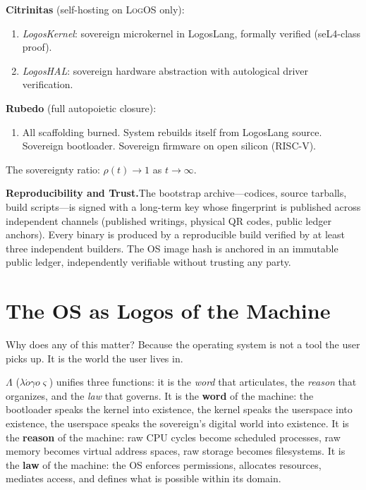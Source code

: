 \documentclass[11pt, oneside]{article}
\newcommand{\sep}{%
    \begin{center}\vspace{2pt}%
    \textcolor{LogosGray}{\textemdash\textemdash\textemdash}%
    \vspace{2pt}\end{center}%
}
\newcommand{\LogOS}{\textnormal{\textsc{LogOS}}}
\newcommand{\Logos}{\Lambda}
\begin{document}
\medskip
\noindent\textbf{Citrinitas} (self-hosting on \LogOS{} only):
\begin{enumerate}[label=\arabic*., noitemsep, leftmargin=2.2em, start=10]
\item \textit{LogosKernel}: sovereign microkernel in LogosLang, formally
      verified (seL4-class proof).
\item \textit{LogosHAL}: sovereign hardware abstraction with autological
      driver verification.
\end{enumerate}

\medskip
\noindent\textbf{Rubedo} (full autopoietic closure):
\begin{enumerate}[label=\arabic*., noitemsep, leftmargin=2.2em, start=12]
\item All scaffolding burned. System rebuilds itself from LogosLang
      source. Sovereign bootloader. Sovereign firmware on open silicon
      (RISC-V).
\end{enumerate}

\medskip
\noindent The sovereignty ratio:
$\rho(t) \to 1$ as $t \to \infty$.

\sep

\noindent\textbf{Reproducibility and Trust.}\quad The bootstrap
archive---codices, source tarballs, build scripts---is signed with a
long-term key whose fingerprint is published across independent channels
(published writings, physical QR codes, public ledger anchors). Every
binary is produced by a reproducible build verified by at least three
independent builders. The OS image hash is anchored in an immutable
public ledger, independently verifiable without trusting any party.

\section{The OS as Logos of the Machine}

Why does any of this matter? Because the operating system is not a tool
the user picks up. It is the world the user lives in.

$\Logos$ ($\lambda\acute{o}\gamma o\varsigma$) unifies three functions:
it is the \textit{word} that articulates, the \textit{reason} that
organizes, and the \textit{law} that governs. It is the \textbf{word}
of the machine: the bootloader speaks the kernel into existence, the
kernel speaks the userspace into existence, the userspace speaks the
sovereign's digital world into existence. It is the \textbf{reason} of
the machine: raw CPU cycles become scheduled processes, raw memory
becomes virtual address spaces, raw storage becomes filesystems. It is
the \textbf{law} of the machine: the OS enforces permissions, allocates
resources, mediates access, and defines what is possible within its
domain.
\end{document}
